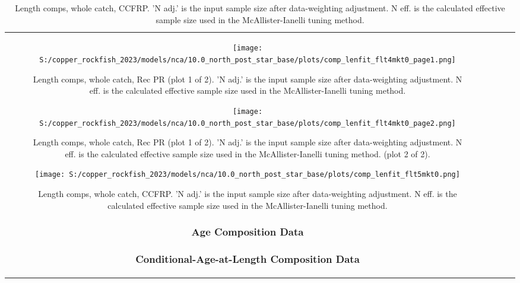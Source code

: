 \documentclass[11pt,
  letterpaper,
]{article}
\begin{document}
\begin{longtable}[t]{c>{\centering\arraybackslash}p{2cm}>{\centering\arraybackslash}p{2cm}>{\centering\arraybackslash}p{2cm}}
\begin{figure}
{\centering
\texttt{[image: S:/copper\_rockfish\_2023/models/nca/10.0\_north\_post\_star\_base/plots/comp\_lenfit\_flt4mkt0\_page1.png]}
}
\caption{Length comps, whole catch, Rec PR (plot 1 of 2).  'N adj.' is the input sample size after data-weighting adjustment. N eff. is the calculated effective sample size used in the McAllister-Ianelli tuning method.\label{fig:comp-lenfit-flt4mkt0-page1}}
\end{figure}

\begin{figure}
{\centering
\texttt{[image: S:/copper\_rockfish\_2023/models/nca/10.0\_north\_post\_star\_base/plots/comp\_lenfit\_flt4mkt0\_page2.png]}
}
\caption{Length comps, whole catch, Rec PR (plot 1 of 2).  'N adj.' is the input sample size after data-weighting adjustment. N eff. is the calculated effective sample size used in the McAllister-Ianelli tuning method. (plot 2 of 2).\label{fig:comp-lenfit-flt4mkt0-page2}}
\end{figure}

\begin{figure}
{\centering
\texttt{[image: S:/copper\_rockfish\_2023/models/nca/10.0\_north\_post\_star\_base/plots/comp\_lenfit\_flt5mkt0.png]}
}
\caption{Length comps, whole catch, CCFRP.  'N adj.' is the input sample size after data-weighting adjustment. N eff. is the calculated effective sample size used in the McAllister-Ianelli tuning method.\label{fig:comp-lenfit-flt5mkt0}}
\end{figure}

\newpage

\subsubsection{Age Composition Data}\label{age-data}

\newpage

\subsubsection{Conditional-Age-at-Length Composition Data}\label{caal-data}


\end{longtable}
\end{document}
